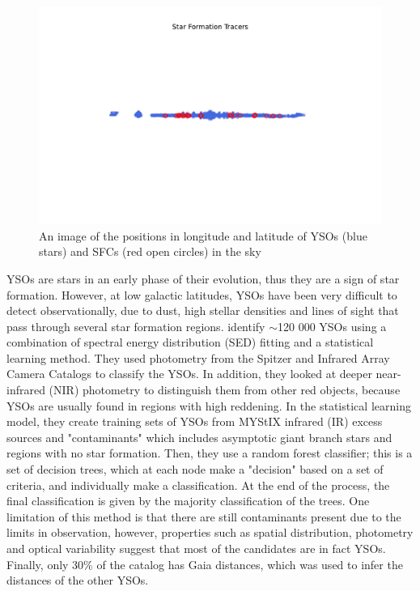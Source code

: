 \documentclass[12pt]{article}
\begin{document}
\begin{figure}
    \centering
    \includegraphics[width=0.8\linewidth]{Tracers_all.pdf}
    \caption{An image of the positions in longitude and latitude of YSOs (blue stars) and SFCs (red open circles) in the sky}
    \label{fig:alltracers}
\end{figure}

YSOs are stars in an early phase of their evolution, thus they are a sign of star formation. However, at low galactic latitudes, YSOs have been very difficult to detect observationally, due to dust, high stellar densities and lines of sight that pass through several star formation regions. \cite{Kuhn2021} identify $\sim$120 000 YSOs using a combination of spectral energy distribution (SED) fitting and a statistical learning method. They used photometry from the Spitzer \parencite[]{Werner_2004} and Infrared Array Camera \parencite[IRAC]{Fazio_2004} Catalogs to classify the YSOs. In addition, they looked at deeper near-infrared (NIR) photometry to distinguish them from other red objects, because YSOs are usually found in regions with high reddening. In the statistical learning model, they create training sets of YSOs from MYStIX infrared (IR) excess sources and "contaminants" which includes asymptotic giant branch stars and regions with no star formation. Then, they use a random forest classifier; this is a set of decision trees, which at each node make a "decision" based on a set of criteria, and individually make a classification. At the end of the process, the final classification is given by the majority classification of the trees. One limitation of this method is that there are still contaminants present due to the limits in observation, however, properties such as spatial distribution, photometry and optical variability suggest that most of the candidates are in fact YSOs. Finally, only 30\% of the catalog has Gaia distances, which was used to infer the distances of the other YSOs.  
\end{document}
